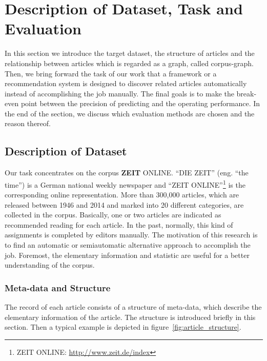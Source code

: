 \section{Description of Dataset, Task and Evaluation}
\label{sec:3}

In this section we introduce the target dataset, the structure of articles and the relationship between articles which is regarded as a graph, called corpus-graph. Then, we bring forward the task of our work that a framework or a recommendation system is designed to discover related articles automatically instead of accomplishing the job manually. The final goals is to make the break-even point between the precision of predicting and the operating performance. In the end of the section, we discuss which evaluation methods are chosen and the reason thereof. 

\subsection{Description of Dataset}
\label{sec:3.1}

Our task concentrates on the corpus \textbf{ZEIT} ONLINE. ``DIE ZEIT'' (eng. ``the time'') is a German national weekly newspaper and ``ZEIT ONLINE''\footnote{ZEIT ONLINE: \url{http://www.zeit.de/index}} is the corresponding online representation. More than 300,000 articles, which are released between 1946 and 2014 and marked into 20 different categories, are collected in the corpus. Basically, one or two articles are indicated as recommended reading for each article. In the past, normally, this kind of assignments is completed by editors manually. The motivation of this research is to find an automatic or semiautomatic alternative approach to accomplish the job. Foremost, the elementary information and statistic are useful for a better understanding of the corpus. 

\subsubsection{Meta-data and Structure}
\label{sec:3structure}

The record of each article consists of a structure of meta-data, which describe the elementary information of the article. The structure is introduced briefly in this section. Then a typical example is depicted in figure~\ref{fig:article_structure}.



    


